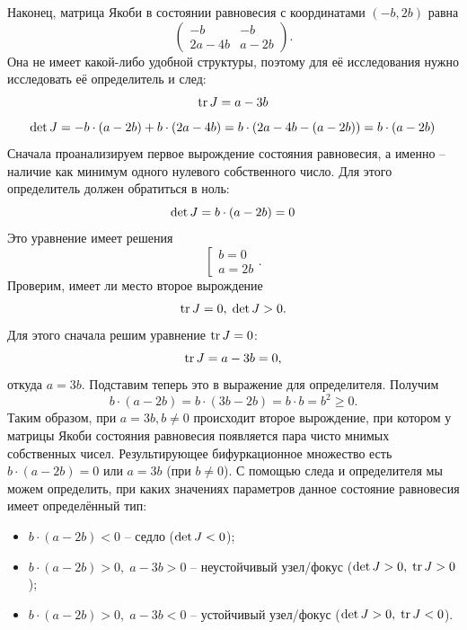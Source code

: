 Наконец, матрица Якоби в состоянии равновесия с координатами $ \left ( -b, 2b \right ) $  равна 
$$ \begin{pmatrix}
	-b & -b \\
	2a-4b &  a-2b
\end{pmatrix} .$$
Она не имеет какой-либо удобной структуры, поэтому для её исследования нужно исследовать её определитель и след:
$$ {\rm tr}\, J = a-3b $$
$$ {\rm det}\, J = 
-b \cdot (a-2b) + b \cdot (2a-4b) = 
b \cdot ( 2a-4b - (a-2b))  = b \cdot \left ( a-2b) \right. $$
Сначала проанализируем первое вырождение состояния равновесия, а именно -- наличие как минимум одного нулевого собственного число. 
Для этого определитель должен обратиться в ноль: 
$$ {\rm det}\, J = b \cdot \left ( a-2b) = 0\right.$$
Это уравнение имеет решения
$$
\left \lbrack 
\begin{matrix}
	b = 0 \\
	a = 2b
\end{matrix}
\right . .
$$
Проверим, имеет ли место второе вырождение 
$$ {\rm tr}\, J = 0, \; {\rm det}\, J > 0.$$
Для этого сначала решим уравнение ${\rm tr}\, J = 0$:
$${\rm tr}\, J = a-3b = 0,$$
откуда $a = 3b$.
Подставим теперь это в выражение для определителя.
Получим 
$$  b \cdot  ( a-2b) = b \cdot  ( 3b-2b) = b \cdot  b = b^2 \geq 0.$$
Таким образом, при $a = 3b, b \neq 0$ происходит второе вырождение, при котором у матрицы Якоби состояния равновесия появляется пара чисто мнимых собственных
чисел.
{\color{blue} Результирующее бифуркационное множество есть $b \cdot ( a-2b)=0$ или $a = 3b $ (при $b \ne 0 $).} С помощью следа и определителя мы можем определить, при каких значениях параметров данное состояние равновесия имеет определённый тип:
\begin{itemize}
	\item{$b \cdot ( a-2b) < 0$ -- седло (${\rm det}\, J < 0$); }
	\item{$b \cdot ( a-2b) > 0, \; a-3b > 0$ -- неустойчивый узел/фокус (${\rm det}\, J > 0, \; {\rm tr}\, J > 0$);}
	\item{$b \cdot ( a-2b) > 0, \; a-3b < 0$ -- устойчивый узел/фокус (${\rm det}\, J > 0, \; {\rm tr}\, J < 0$).}
\end{itemize} 


